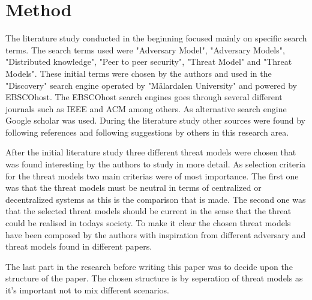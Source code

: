 \section{Method}
The literature study conducted in the beginning focused mainly on specific search terms. The search terms used were "Adversary Model", "Adversary Models", "Distributed knowledge", "Peer to peer security", "Threat Model" and "Threat Models".
These initial terms were chosen by the authors and used in the "Discovery" search engine operated by "Mälardalen University" and powered by EBSCOhost.
The EBSCOhost search engines goes through several different journals such as IEEE and ACM among others.
As alternative search engine Google scholar was used.
During the literature study other sources were found by following references and following suggestions by others in this research area.

After the initial literature study three different threat models were chosen that was found interesting by the authors to study in more detail.
As selection criteria for the threat models two main criterias were of most importance. 
The first one was that the threat models must be neutral in terms of centralized or decentralized systems as this is the comparison that is made.
The second one was that the selected threat models should be current in the sense that the threat could be realised in todays society.
To make it clear the chosen threat models have been composed by the authors with inspiration from different adversary and threat models found in different papers.

The last part in the research before writing this paper was to decide upon the structure of the paper. The chosen structure is by seperation of threat models as it's important not to mix different scenarios.
